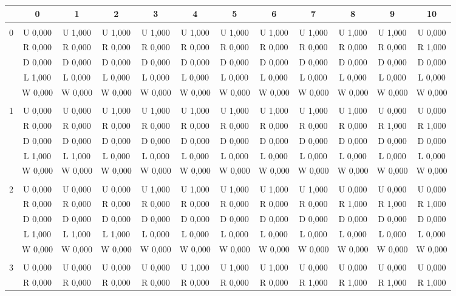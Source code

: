  \begin{table}[htbp]
\centering
\begin{tiny}
\begin{tabular}{c|c|c|c|c|c|c|c|c|c|c|c|}
&0&1&2&3&4&5&6&7&8&9&10\\ \hline\\
0&U 0,000&U 1,000&U 1,000&U 1,000&U 1,000&U 1,000&U 1,000&U 1,000&U 1,000&U 1,000&U 0,000\\
&R 0,000&R 0,000&R 0,000&R 0,000&R 0,000&R 0,000&R 0,000&R 0,000&R 0,000&R 0,000&R 1,000\\
&D 0,000&D 0,000&D 0,000&D 0,000&D 0,000&D 0,000&D 0,000&D 0,000&D 0,000&D 0,000&D 0,000\\
&L 1,000&L 0,000&L 0,000&L 0,000&L 0,000&L 0,000&L 0,000&L 0,000&L 0,000&L 0,000&L 0,000\\
&W 0,000&W 0,000&W 0,000&W 0,000&W 0,000&W 0,000&W 0,000&W 0,000&W 0,000&W 0,000&W 0,000\\
\hline \\
1&U 0,000&U 0,000&U 1,000&U 1,000&U 1,000&U 1,000&U 1,000&U 1,000&U 1,000&U 0,000&U 0,000\\
&R 0,000&R 0,000&R 0,000&R 0,000&R 0,000&R 0,000&R 0,000&R 0,000&R 0,000&R 1,000&R 1,000\\
&D 0,000&D 0,000&D 0,000&D 0,000&D 0,000&D 0,000&D 0,000&D 0,000&D 0,000&D 0,000&D 0,000\\
&L 1,000&L 1,000&L 0,000&L 0,000&L 0,000&L 0,000&L 0,000&L 0,000&L 0,000&L 0,000&L 0,000\\
&W 0,000&W 0,000&W 0,000&W 0,000&W 0,000&W 0,000&W 0,000&W 0,000&W 0,000&W 0,000&W 0,000\\
\hline \\
2&U 0,000&U 0,000&U 0,000&U 1,000&U 1,000&U 1,000&U 1,000&U 1,000&U 0,000&U 0,000&U 0,000\\
&R 0,000&R 0,000&R 0,000&R 0,000&R 0,000&R 0,000&R 0,000&R 0,000&R 1,000&R 1,000&R 1,000\\
&D 0,000&D 0,000&D 0,000&D 0,000&D 0,000&D 0,000&D 0,000&D 0,000&D 0,000&D 0,000&D 0,000\\
&L 1,000&L 1,000&L 1,000&L 0,000&L 0,000&L 0,000&L 0,000&L 0,000&L 0,000&L 0,000&L 0,000\\
&W 0,000&W 0,000&W 0,000&W 0,000&W 0,000&W 0,000&W 0,000&W 0,000&W 0,000&W 0,000&W 0,000\\
\hline \\
3&U 0,000&U 0,000&U 0,000&U 0,000&U 1,000&U 1,000&U 1,000&U 0,000&U 0,000&U 0,000&U 0,000\\
&R 0,000&R 0,000&R 0,000&R 0,000&R 0,000&R 0,000&R 0,000&R 1,000&R 1,000&R 1,000&R 1,000\\

\end{tabular}
\end{tiny}
\end{table}
